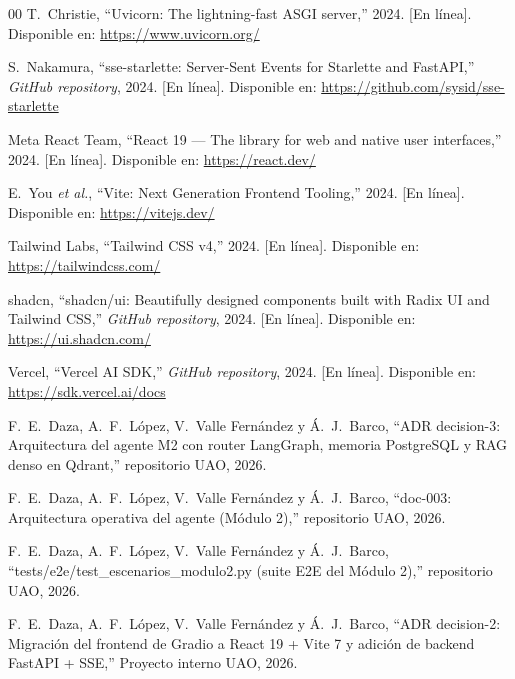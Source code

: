 \documentclass[conference]{IEEEtran}
\begin{document}
\begin{thebibliography}{00}
T.~Christie,
``Uvicorn: The lightning-fast ASGI server,''
2024.
[En línea]. Disponible en: \url{https://www.uvicorn.org/}

S.~Nakamura,
``sse-starlette: Server-Sent Events for Starlette and FastAPI,''
\textit{GitHub repository}, 2024.
[En línea]. Disponible en:
\url{https://github.com/sysid/sse-starlette}

Meta React Team,
``React 19 --- The library for web and native user interfaces,''
2024.
[En línea]. Disponible en: \url{https://react.dev/}

E.~You \textit{et al.},
``Vite: Next Generation Frontend Tooling,''
2024.
[En línea]. Disponible en: \url{https://vitejs.dev/}

Tailwind Labs,
``Tailwind CSS v4,''
2024.
[En línea]. Disponible en: \url{https://tailwindcss.com/}

shadcn,
``shadcn/ui: Beautifully designed components built with Radix UI and
Tailwind CSS,''
\textit{GitHub repository}, 2024.
[En línea]. Disponible en: \url{https://ui.shadcn.com/}

Vercel,
``Vercel AI SDK,''
\textit{GitHub repository}, 2024.
[En línea]. Disponible en: \url{https://sdk.vercel.ai/docs}

F.~E.~Daza, A.~F.~López, V.~Valle Fernández y Á.~J.~Barco,
``ADR decision-3: Arquitectura del agente M2 con router LangGraph, memoria PostgreSQL y RAG denso en Qdrant,''
repositorio UAO, 2026.

F.~E.~Daza, A.~F.~López, V.~Valle Fernández y Á.~J.~Barco,
``doc-003: Arquitectura operativa del agente (Módulo 2),''
repositorio UAO, 2026.

F.~E.~Daza, A.~F.~López, V.~Valle Fernández y Á.~J.~Barco,
``tests/e2e/test\_escenarios\_modulo2.py (suite E2E del Módulo 2),''
repositorio UAO, 2026.

F.~E.~Daza, A.~F.~López, V.~Valle Fernández y Á.~J.~Barco,
``ADR decision-2: Migración del frontend de Gradio a React 19 + Vite 7 y
adición de backend FastAPI + SSE,''
Proyecto interno UAO, 2026.

\end{thebibliography}
\end{document}
